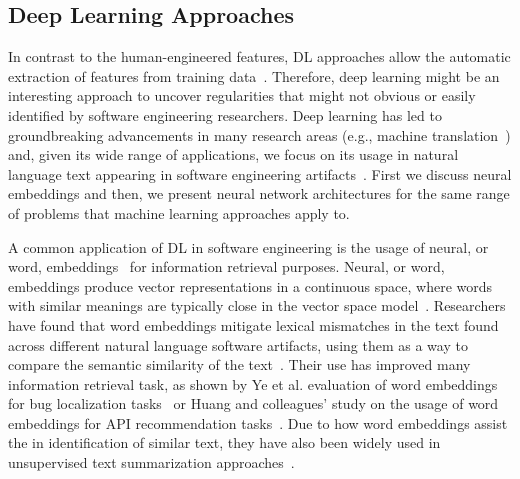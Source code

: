 \subsection{Deep Learning Approaches}
\label{cp2:deep-learning}





In contrast to the human-engineered features,
\acf{DL} approaches allow the automatic extraction of features 
from training data~\cite{Deng2018, zhang2021deep}.
Therefore, 
deep learning might be an interesting 
approach to
uncover regularities 
that might not obvious or easily identified
by software engineering researchers.
Deep learning has led to groundbreaking advancements in many 
research areas (e.g., machine translation~\cite{lopez2008translation}) 
and, given its wide range of applications, 
we focus
on its usage in natural language text appearing in
software engineering artifacts~\cite{ferreira2021, li2018deep, watson2022}.
First we discuss neural embeddings and then, we present 
neural network architectures 
for the same range of problems 
that machine learning approaches apply to.






A common application of \acs{DL} in software engineering is the usage of neural, or word, embeddings~\cite{Mikolov2013}
for information retrieval purposes. 
Neural, or word, embeddings produce vector representations in a continuous space,
where words with similar meanings are typically close in the vector space model~\cite{harris1954distributional, mikolov2013efficient}. 
Researchers have found that word
embeddings mitigate lexical mismatches in the text found across different 
natural language software artifacts,
using them as a way to compare the semantic similarity of the text~\cite{mihalcea2006}.
Their use has improved many information retrieval task,
as shown by Ye et al. evaluation of word embeddings
for bug localization tasks~\cite{Ye2016}
or Huang and colleagues' study on 
the usage of word embeddings for API recommendation tasks~\cite{Huang2018}. 
Due to how word embeddings assist the in identification 
of similar text, they have also been widely used in unsupervised text 
summarization approaches~\cite{Ponzanelli2017, Xu2017, Jiang2017}.





